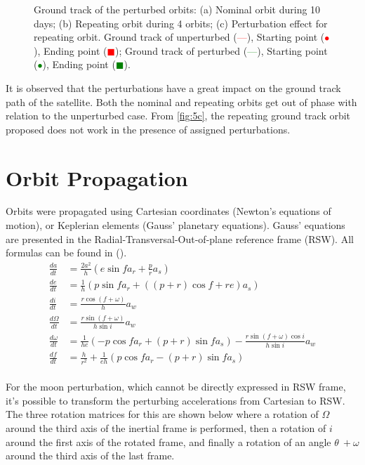 \documentclass{article}
\newcommand{\reddashedline}{\textcolor{red}{---}}
\newcommand{\greendashedline}{\textcolor{green}{---}}
\begin{document}
\begin{figure}[H]
	\caption{Ground track of the perturbed orbits: (a) Nominal orbit during 10 days; (b) Repeating orbit during 4 orbits; (c) Perturbation effect for repeating orbit. Ground track of unperturbed (\reddashedline), Starting point (\textcolor{red}{$\bullet$}), Ending point (\textcolor{red}{$\blacksquare$}); Ground track of perturbed (\greendashedline), Starting point (\textcolor{green}{$\bullet$}), Ending point (\textcolor{green}{$\blacksquare$}).
	}
\end{figure}

It is observed that the perturbations have a great impact on the ground track path of the satellite. Both the nominal and repeating orbits get out of phase with relation to the unperturbed case. From \ref{fig:5c}, the repeating ground track orbit proposed does not work in the presence of assigned perturbations. 

\section{Orbit Propagation}

Orbits were propagated using Cartesian coordinates (Newton’s equations of motion), or Keplerian elements (Gauss’ planetary equations). Gauss' equations are presented in the Radial-Transversal-Out-of-plane reference frame (RSW). All formulas can be found in ().\\ %

\begin{align*}
	\frac{da}{dt} &= \frac{2a^2}{h} \left( e\sin f a_r + \frac{p}{r} a_s \right) \\[10pt]
	\frac{de}{dt} &= \frac{1}{h} \left( p\sin f a_r + \left( (p + r) \cos f + re \right) a_s \right) \\[10pt]
	\frac{di}{dt} &= \frac{r\cos (f + \omega)}{h} a_w \\[10pt]
	\frac{d\Omega}{dt} &= \frac{r\sin (f + \omega)}{h\sin i} a_w \\[10pt]
	\frac{d\omega}{dt} &= \frac{1}{he} \left( -p\cos f a_r + (p + r)\sin f a_s \right) - \frac{r\sin(f + \omega) \cos i}{h\sin i} a_w \\[10pt]
	\frac{df}{dt} &= \frac{h}{r^2} + \frac{1}{eh} \left( p\cos f a_r - (p + r)\sin f a_s \right)
\end{align*}
\\

For the moon perturbation, which cannot be directly expressed in RSW frame, it's possible to transform the perturbing accelerations from Cartesian to RSW. The three rotation matrices for this are shown below where a rotation of \(\Omega\) around the third axis of the inertial frame is performed, then a rotation of \(i\) around the first axis of the rotated frame, and finally a rotation of an angle \(\theta\ + \omega\) around the third axis of the last frame. 
\end{document}
